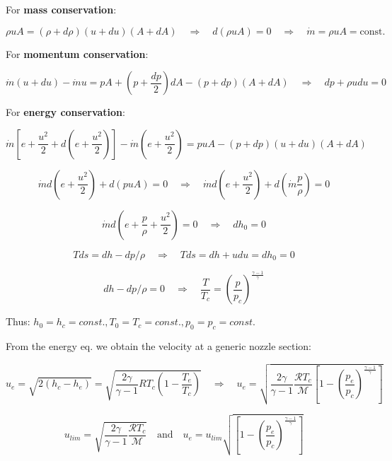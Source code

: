 \documentclass[
  ignorenonframetext,
]{beamer}
\begin{document}
\begin{frame}
For \textbf{mass conservation}:

\[ \rho u A = (\rho + d\rho)(u + du)(A + dA) \quad \Rightarrow \quad d(\rho u A) = 0 \quad \Rightarrow \quad \dot{m} = \rho u A = \text{const.} \]

For \textbf{momentum conservation}:

\[ \dot{m}(u + du) - \dot{m}u = pA + \left(p + \frac{dp}{2}\right)dA - \left(p + dp\right)(A + dA) \quad \Rightarrow \quad dp + \rho u du = 0 \]

For \textbf{energy conservation}:

\[ \dot{m} \left[e + \frac{u^2}{2} + d \left(e + \frac{u^2}{2} \right) \right] - \dot{m} \left(e+\frac{u^2}{2}\right) = puA - (p + dp)(u + du)(A + dA) \]

\[ \dot{m} d\left(e + \frac{u^2}{2}\right) + d(puA) = 0 \quad \Rightarrow \quad \dot{m} d\left(e + \frac{u^2}{2}\right) + d\left(\dot{m} \frac{p}{\rho}\right) = 0 \]

\[ \dot{m} d\left(e + \frac{p}{\rho} + \frac{u^2}{2}\right) = 0 \quad \Rightarrow \quad dh_0 = 0 \]
\end{frame}

\begin{frame}
\[ Tds = dh - dp/\rho \quad \Rightarrow \quad Tds = dh + udu = dh_0 = 0 \]

\[ dh - dp/\rho = 0 \quad \Rightarrow \quad \frac{T}{T_c} = \left(\frac{p}{p_c}\right)^\frac{\gamma - 1}{\gamma} \]

Thus: \(h_0 = h_c = const., T_0 = T_c = const., p_0 = p_c = const.\)

From the energy eq. we obtain the velocity at a generic nozzle section:

\[
u_e = \sqrt{2(h_c - h_e)} = \sqrt{\frac{2 \gamma}{\gamma - 1} R T_c \left(1 - \frac{T_e}{T_c}\right)}
\quad \Rightarrow \quad 
u_e = \sqrt{\frac{2 \gamma}{\gamma - 1} \frac{\mathcal{R} T_c}{\mathcal{M}} \left[1 - \left(\frac{p_e}{p_c}\right)^{\frac{\gamma - 1}{\gamma}}\right]}
\]

\[u_{lim} = \sqrt{\frac{2\gamma}{\gamma - 1} \frac{\mathcal{R}T_c}{\mathcal{M}}} \quad \text{and} \quad u_e = u_{lim} \sqrt{\left[1 - \left(\frac{p_e}{p_c}\right)^\frac{\gamma-1}{\gamma}\right]}\]
\end{frame}
\end{document}
